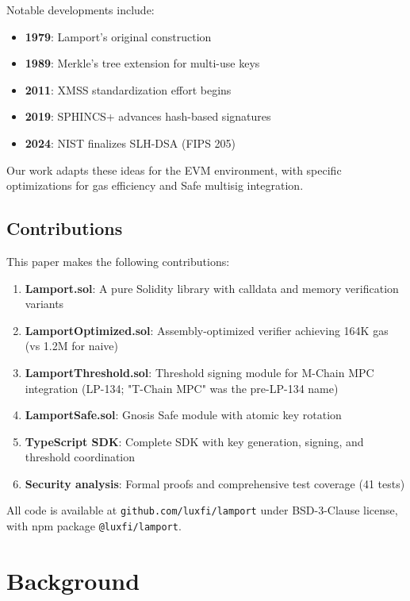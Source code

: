\documentclass[11pt,a4paper]{article}
\begin{document}
Notable developments include:
\begin{itemize}[leftmargin=*]
    \item \textbf{1979}: Lamport's original construction~\cite{lamport1979}
    \item \textbf{1989}: Merkle's tree extension for multi-use keys~\cite{merkle1989}
    \item \textbf{2011}: XMSS standardization effort begins~\cite{buchmann2011}
    \item \textbf{2019}: SPHINCS+ advances hash-based signatures~\cite{bernstein2019}
    \item \textbf{2024}: NIST finalizes SLH-DSA (FIPS 205)~\cite{nist2024}
\end{itemize}

Our work adapts these ideas for the EVM environment, with specific optimizations for gas efficiency and Safe multisig integration.

\subsection{Contributions}

This paper makes the following contributions:

\begin{enumerate}[leftmargin=*]
    \item \textbf{Lamport.sol}: A pure Solidity library with calldata and memory verification variants
    \item \textbf{LamportOptimized.sol}: Assembly-optimized verifier achieving 164K gas (vs 1.2M for naive)
    \item \textbf{LamportThreshold.sol}: Threshold signing module for M-Chain MPC integration (LP-134; "T-Chain MPC" was the pre-LP-134 name)
    \item \textbf{LamportSafe.sol}: Gnosis Safe module with atomic key rotation
    \item \textbf{TypeScript SDK}: Complete SDK with key generation, signing, and threshold coordination
    \item \textbf{Security analysis}: Formal proofs and comprehensive test coverage (41 tests)
\end{enumerate}

All code is available at \texttt{github.com/luxfi/lamport} under BSD-3-Clause license, with npm package \texttt{@luxfi/lamport}.

\section{Background}
\end{document}
